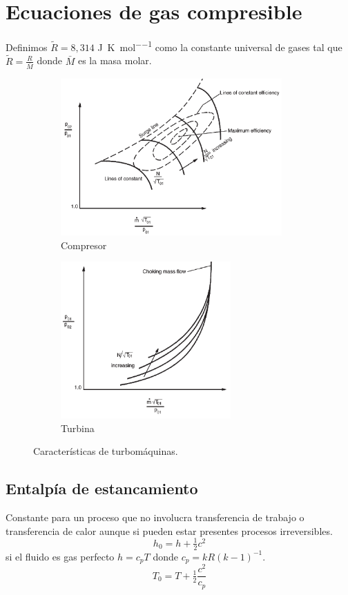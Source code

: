 \documentclass{article}
\newcommand{\cp}{c_p}
\newcommand{\cteuniversal}{\ensuremath{\tilde{R}}}
\newcommand{\molarmass}{\ensuremath{{\scriptstyle \bar{M}}}}
\newcommand{\Rconst}{R}
\newcommand{\gasconst}{k}
\begin{document}
\section{Ecuaciones de gas compresible}
Definimos $\cteuniversal=8,314$ \si{\joule \per \kelvin\per \mole} como la constante universal de gases tal que $\cteuniversal = \frac{R}{\molarmass}$ donde $\molarmass$ es la masa molar.
\begin{figure}[htb!]
\centering
\begin{subfigure}{.49\textwidth}
\centering
\includegraphics[height=6cm]{fig/caracteristicascompresor.png}
\caption{Compresor}
\label{fig:caractcompresor}
\end{subfigure}%
\begin{subfigure}{.49\textwidth}
\centering
\includegraphics[height= 6cm]{fig/caracteristicasturbina.png}
\caption{Turbina}
\label{fig:caractturbina}
\end{subfigure}
\caption{Características de turbomáquinas.}
\label{fig:caracteristicasturbomaquinas}
\end{figure}
\subsection{Entalpía de estancamiento} 
Constante para un proceso que no involucra transferencia de trabajo o transferencia de calor aunque si pueden estar presentes procesos irreversibles.
\[
h_0 = h+\tfrac{1}{2}c^2
\]
si el fluido es gas perfecto \( h=\cp T\) donde \( \cp = \gasconst \Rconst (\gasconst-1)^{-1} \).
\[
T_0 = T + \tfrac{1}{2}\frac{c^2}{\cp}
\]
\end{document}
